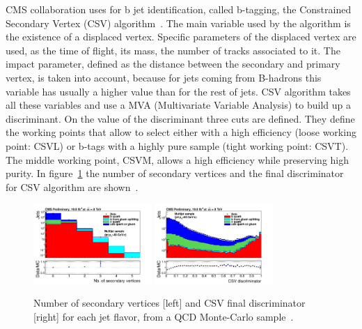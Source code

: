 %
CMS collaboration uses for b jet identification, called b-tagging, the Constrained Secondary Vertex (CSV) algorithm~\cite{Chatrchyan:2012jua, CMS-PAS-BTV-13-001}. The main variable used by the algorithm is the existence of a displaced vertex. Specific parameters of the displaced vertex are used, as the time of flight, its mass, the number of tracks associated to it. The impact parameter, defined as the distance between the secondary and primary vertex, is taken into account, because for jets coming from B-hadrons this variable has usually a higher value than for the rest of jets. CSV algorithm takes all these variables and use a MVA (Multivariate Variable Analysis) to build up a discriminant. On the value of the discriminant three cuts are defined. They define the working points that allow to select either with a high efficiency (loose working point: CSVL) or b-tags with a highly pure sample (tight working point: CSVT). The middle working point, CSVM, allows a high efficiency while preserving high purity. In figure~\ref{fig:CSVVar} the number of secondary vertices and the final discriminator for CSV algorithm are shown~\cite{CMS-PAS-BTV-13-001}.

\begin{figure}[!Hhtbp]
  \begin{center}
    \includegraphics[width=0.4\textwidth]{figs/sv_multi_0_Log.png}
    \includegraphics[width=0.4\textwidth]{figs/pdf-sub.png}
    \caption{Number of secondary vertices [left] and CSV final discriminator [right] for each jet flavor, from a QCD Monte-Carlo sample~\cite{CMS-PAS-BTV-13-001}.}
    \label{fig:CSVVar}
  \end{center}
\end{figure}

